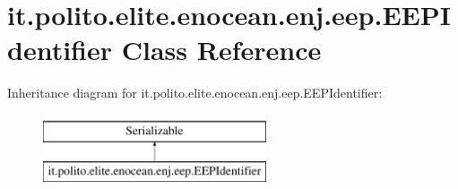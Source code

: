 \hypertarget{classit_1_1polito_1_1elite_1_1enocean_1_1enj_1_1eep_1_1_e_e_p_identifier}{}\section{it.\+polito.\+elite.\+enocean.\+enj.\+eep.\+E\+E\+P\+Identifier Class Reference}
\label{classit_1_1polito_1_1elite_1_1enocean_1_1enj_1_1eep_1_1_e_e_p_identifier}
Inheritance diagram for it.\+polito.\+elite.\+enocean.\+enj.\+eep.\+E\+E\+P\+Identifier\+:\begin{figure}[H]
\begin{center}
\leavevmode
\includegraphics[height=2.000000cm]{classit_1_1polito_1_1elite_1_1enocean_1_1enj_1_1eep_1_1_e_e_p_identifier}
\end{center}
\end{figure}
